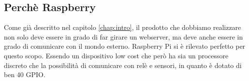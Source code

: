 \subsection{Perchè Raspberry}

Come già descritto nel capitolo \ref{chap:intro}, il prodotto che dobbiamo realizzare non solo deve essere in grado di far girare un webserver, ma deve anche essere in grado di comunicare con il mondo esterno. Raspberry Pi si è rilevato perfetto per questo scopo.
Essendo un dispositivo low cost che però ha sia un processore discreto che la possibilità di comunicare con relè e sensori, in quanto è dotato di ben 40 GPIO.